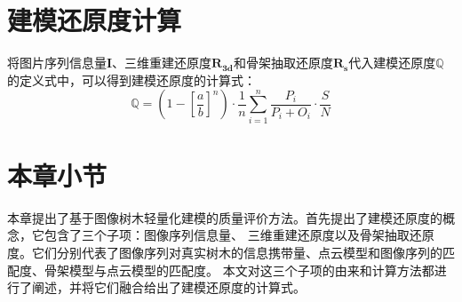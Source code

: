 \section{建模还原度计算}
将图片序列信息量$\mathbf{I}$、三维重建还原度$\mathbf{R_{3d}}$和骨架抽取还原度$\mathbf{R_s}$代入建模还原度$\mathbb{Q}$
的定义式中，可以得到建模还原度的计算式：\\
\begin{equation}
	\mathbb{Q}= (1-\left[\frac{a}{b}\right]^n)\cdot \frac{1}{n}\sum_{i=1}^n \frac{P_i}{P_i+O_i} \cdot \frac{S}{N}
\end{equation}

\section{本章小节}
本章提出了基于图像树木轻量化建模的质量评价方法。首先提出了建模还原度的概念，它包含了三个子项：图像序列信息量、
三维重建还原度以及骨架抽取还原度。它们分别代表了图像序列对真实树木的信息携带量、点云模型和图像序列的匹配度、骨架模型与点云模型的匹配度。
本文对这三个子项的由来和计算方法都进行了阐述，并将它们融合给出了建模还原度的计算式。
